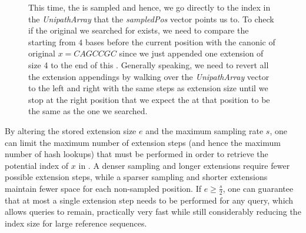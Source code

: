 \begin{figure}
{{  This time, the \kmer is sampled and hence, we go directly to the index in the \emph{UnipathArray}
  that the \emph{sampledPos} vector points us to. To check if the original \kmer we searched for
  exists, we need to compare the \kmer starting from $4$ bases before the current position 
  with the canonic of original \kmer $x=CAGCCGC$ since we just appended one extension of size 4
  to the end of this \kmer. Generally speaking, we need to revert all the extension appendings 
  by walking over the \emph{UnipathArray} vector to the left and right with the same steps as
  extension size until we stop at the right position that we expect the \kmer at that position to be the
  same as the one we searched.}}
\label{fig:sparse_query}
\end{figure}



By altering the stored extension size $e$ and the maximum sampling rate $s$, one
can limit the maximum number of extension steps (and hence the maximum number of
hash lookups) that must be performed in order to retrieve the potential index of
$x$ in \cseq. A denser sampling and longer extensions require fewer possible
extension steps, while a sparser sampling and shorter extensions maintain fewer space
for each non-sampled position. If $e \geq \frac{s}{2}$, one can guarantee that
at most a single extension step needs to be performed for any \kmer query, which
allows \kmer queries to remain, practically very fast while still considerably
reducing the index size for large reference sequences.


